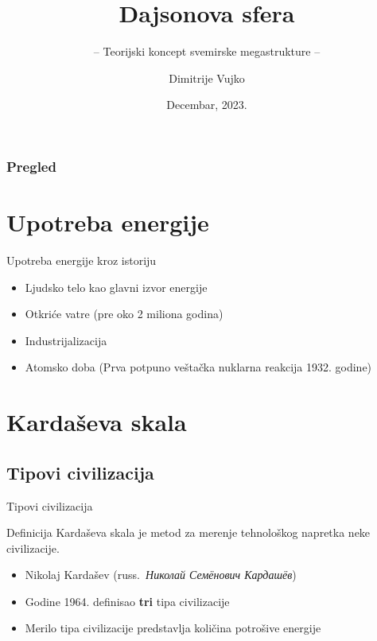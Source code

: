\documentclass[13pt]{beamer}
\title{Dajsonova sfera}
\subtitle{-- Teorijski koncept svemirske megastrukture --}
\author{Dimitrije Vujko}
\institute{Matematički fakultet,\\ Univerzitet u Beogradu}
\date{
	\footnotesize{Decembar, 2023.}	
}
\begin{document}
\maketitle



\begin{frame}
	\frametitle{Pregled} %
	\tableofcontents[hidesubsections] 
\end{frame}



\section{Upotreba energije}

\begin{frame}{Upotreba energije kroz istoriju}

\begin{itemize}
    \item Ljudsko telo kao glavni izvor energije
    \item Otkriće vatre (pre oko 2 miliona godina)
    \item Industrijalizacija
    \item Atomsko doba (Prva potpuno veštačka nuklarna reakcija 1932. godine)
\end{itemize}

\end{frame}



\section{Kardaševa skala}

\subsection{Tipovi civilizacija}

\begin{frame}{Tipovi civilizacija}

\begin{block}{Definicija}
Kardaševa skala je metod za merenje tehnološkog napretka neke civilizacije.
\end{block}

\begin{itemize}
    \item Nikolaj Kardašev  (russ.~{\em Николай Семёнович Кардашёв})
    \item Godine 1964. definisao \textbf{tri} tipa civilizacije
    \item Merilo tipa civilizacije predstavlja količina potrošive energije
\end{itemize}

\end{frame}
\end{document}
